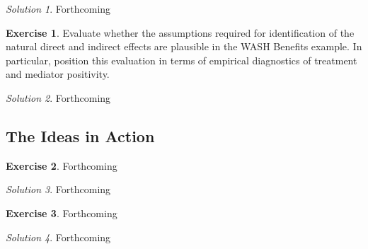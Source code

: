 \documentclass[
  12pt, krantz2,
]{krantz}
\newcommand{\1}{\mathbbm{1}}
\theoremstyle{definition}
\theoremstyle{definition}
\theoremstyle{definition}
\newtheorem{exercise}{Exercise}[chapter]
\theoremstyle{definition}
\theoremstyle{remark}
\newtheorem*{solution}{Solution}
\begin{document}
\begin{solution}
Forthcoming
\end{solution}

\begin{exercise}
Evaluate whether the assumptions required for identification of the natural
direct and indirect effects are plausible in the WASH Benefits example. In
particular, position this evaluation in terms of empirical diagnostics of
treatment and mediator positivity.
\end{exercise}

\begin{solution}
Forthcoming
\end{solution}

\hypertarget{the-ideas-in-action-1}{%
\subsection{The Ideas in Action}\label{the-ideas-in-action-1}}

\begin{exercise}
Forthcoming
\end{exercise}

\begin{solution}
Forthcoming
\end{solution}

\begin{exercise}
Forthcoming
\end{exercise}

\begin{solution}
Forthcoming
\end{solution}

  

\backmatter
\printindex
\end{document}
